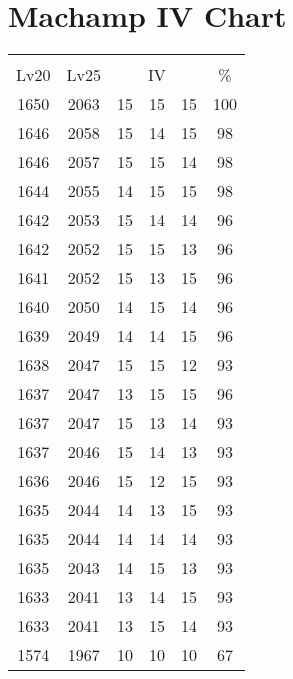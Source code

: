 \documentclass{article}%
\begin{document}
%
\normalsize%
\section{Machamp IV Chart}%
\label{sec:Machamp IV Chart}%
\renewcommand{\arraystretch}{1.5}%
\begin{tabular}{|c|c|c|c|c|c|}%
\hline%
\multicolumn{6}{|c|}{\textcolor{white}{ 
\linebreak{Machamp}
}%
\cellcolor{black}}\\%
\multicolumn{1}{|c}{Lv20}&\multicolumn{1}{c|}{Lv25}&\multicolumn{3}{c|}{IV}&\multicolumn{1}{|c|}{\%}\\%
\hline%
\rowcolor{color100}%
1650&2063&15&15&15&100\\%
\hline%
\rowcolor{color98}%
1646&2058&15&14&15&98\\%
\hline%
\rowcolor{color98}%
1646&2057&15&15&14&98\\%
\hline%
\rowcolor{color98}%
1644&2055&14&15&15&98\\%
\hline%
\rowcolor{color96}%
1642&2053&15&14&14&96\\%
\hline%
\rowcolor{color96}%
1642&2052&15&15&13&96\\%
\hline%
\rowcolor{color96}%
1641&2052&15&13&15&96\\%
\hline%
\rowcolor{color96}%
1640&2050&14&15&14&96\\%
\hline%
\rowcolor{color96}%
1639&2049&14&14&15&96\\%
\hline%
\rowcolor{color93}%
1638&2047&15&15&12&93\\%
\hline%
\rowcolor{color96}%
1637&2047&13&15&15&96\\%
\hline%
\rowcolor{color93}%
1637&2047&15&13&14&93\\%
\hline%
\rowcolor{color93}%
1637&2046&15&14&13&93\\%
\hline%
\rowcolor{color93}%
1636&2046&15&12&15&93\\%
\hline%
\rowcolor{color93}%
1635&2044&14&13&15&93\\%
\hline%
\rowcolor{color93}%
1635&2044&14&14&14&93\\%
\hline%
\rowcolor{color93}%
1635&2043&14&15&13&93\\%
\hline%
\rowcolor{color93}%
1633&2041&13&14&15&93\\%
\hline%
\rowcolor{color93}%
1633&2041&13&15&14&93\\%
\hline%
\rowcolor{color91}%
1574&1967&10&10&10&67\\%
\end{tabular}

%
\end{document}
